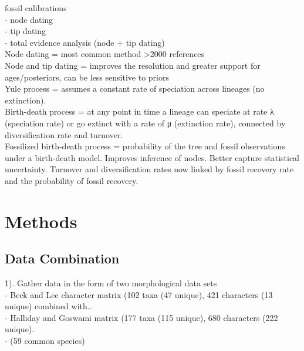 \documentclass[a4paper,11pt]{article}
\begin{document}
fossil calibrations\\
- node dating\\
- tip dating \\
- total evidence analysis (node + tip dating)\\

Node dating = most common method >2000 references\\
Node and tip dating = improves the resolution and greater support for ages/posteriors, can be less sensitive to priors\\

Yule process = assumes a constant rate of speciation across lineages (no extinction).\\

Birth-death process = at any point in time a lineage can speciate at rate λ (speciation rate) or go extinct with a rate of μ (extinction rate), connected by diversification rate and turnover.\\

Fossilized birth-death process = probability of the tree and fossil observations under a birth-death model. Improves inference of nodes. Better capture statistical uncertainty. Turnover and diversification rates now linked by fossil recovery rate and the probability of fossil recovery.\\

\section{Methods}

\subsection{Data Combination}

1). Gather data in the form of two morphological data sets \\
 - Beck and Lee character matrix \citep{beck2014ancient} (102 taxa (47 unique), 421 characters (13 unique) combined with..\\  
 - Halliday and Goswami matrix \citep{halliday2016eutherian} (177 taxa (115 unique), 680 characters (222 unique).\\ 
 - (59 common species)\\
\end{document}
